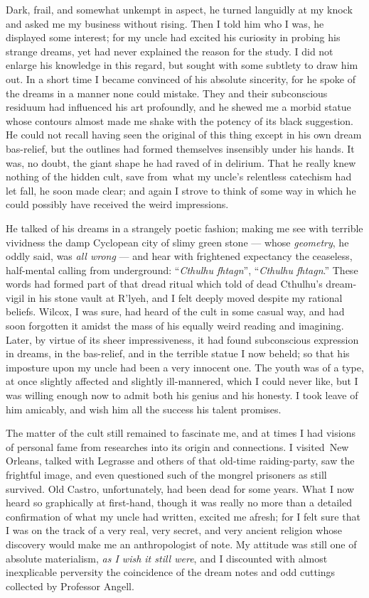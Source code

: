 Dark, frail, and somewhat unkempt in aspect, he turned languidly at my
knock and asked me my business without rising. Then I told him who I
was, he displayed some interest; for my uncle had excited his curiosity
in probing his strange dreams, yet had never explained the reason for
the study. I did not enlarge his knowledge in this regard, but sought
with some subtlety to draw him out. In a short time I became convinced
of his absolute sincerity, for he spoke of the dreams in a manner none
could mistake. They and their subconscious residuum had influenced his
art profoundly, and he shewed me a morbid statue whose contours almost
made me shake with the potency of its black suggestion. He could not
recall having seen the original of this thing except in his own dream
bas-relief, but the outlines had formed themselves insensibly under his
hands. It was, no doubt, the giant shape he had raved of in delirium.
That he really knew nothing of the hidden cult, save from\est\ what my
uncle's relentless catechism had let fall, he soon made clear; and again
I strove to think of some way in which he could possibly have received
the weird impressions.

He talked of his dreams in a strangely poetic fashion; making me see
with terrible vividness the damp Cyclopean city of slimy green stone ---
whose \emph{geometry}, he oddly said, was \emph{all wrong} --- and hear with frightened
expectancy the ceaseless, half-mental calling from underground:
``\emph{Cthulhu fhtagn}'', ``\emph{Cthulhu fhtagn}.''
These words had formed part of that dread ritual which told of dead
Cthulhu's dream-vigil in his stone vault at R'lyeh, and I felt deeply
moved despite my rational beliefs. Wilcox, I was sure, had heard of the
cult in some casual way, and had soon forgotten it amidst the mass of
his equally weird reading and imagining. Later, by virtue of its sheer
impressiveness, it had found subconscious expression in dreams, in the
bas-relief, and in the terrible statue I now beheld; so that his
imposture upon my uncle had been a very innocent one. The youth was of a
type, at once slightly affected and slightly ill-mannered, which I could
never like, but I was willing enough now to admit both his genius and
his honesty. I took leave of him amicably, and wish him all the success
his talent promises.


The matter of the cult still remained to fascinate me, and at times I
had visions of personal fame from researches into its origin and
connections. I visited\est\ New Orleans, talked with Legrasse and others of
that old-time raiding-party, saw the frightful image, and even
questioned such of the mongrel prisoners as still survived. Old Castro,
unfortunately, had been dead for some years. What I now heard so
graphically at first-hand, though it was really no more than a detailed
confirmation of what my uncle had written, excited me afresh; for I felt
sure that I was on the track of a very real, very secret, and very
ancient religion whose discovery would make me an anthropologist of
note. My attitude was still one of absolute materialism, \emph{as I wish it
still were}, and I discounted with almost inexplicable perversity the
coincidence of the dream notes and odd cuttings collected by Professor
Angell.


